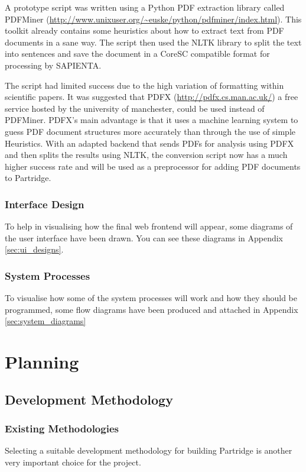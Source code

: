 \documentclass[12pt,a4paper]{article}
\begin{document}
A prototype script was written using a Python PDF extraction library called
PDFMiner (\url{http://www.unixuser.org/~euske/python/pdfminer/index.html}).
This toolkit already contains some heuristics about how to extract text from
PDF documents in a sane way\cite{pdfminer}. The script then used the NLTK
library to split the text into sentences and save the document in a CoreSC
compatible format for processing by SAPIENTA. 

The script had limited success due to the high variation of formatting within
scientific papers. It was suggested that PDFX (\url{http://pdfx.cs.man.ac.uk/})
a free service hosted by the university of manchester, could be used instead of
PDFMiner. PDFX's main advantage is that it uses a machine learning system to
guess PDF document structures more accurately than through the use of simple
Heuristics. With an adapted backend that sends PDFs for analysis using PDFX and
then splits the results using NLTK, the conversion script now has a much higher
success rate and will be used as a preprocessor for adding PDF  documents to
Partridge.

\subsubsection{Interface Design}

To help in visualising how the final web frontend will appear, some diagrams of
the user interface have been drawn. You can see these diagrams in Appendix
\ref{sec:ui_designs}. 

\subsubsection{System Processes}

To visualise how some of the system processes will work and how they should be
programmed, some flow diagrams have been produced and attached in Appendix
\ref{sec:system_diagrams}

\section{Planning}

\subsection{Development Methodology}

\subsubsection{Existing Methodologies}
Selecting a suitable development methodology for building Partridge is another
very important choice for the project.
\end{document}
